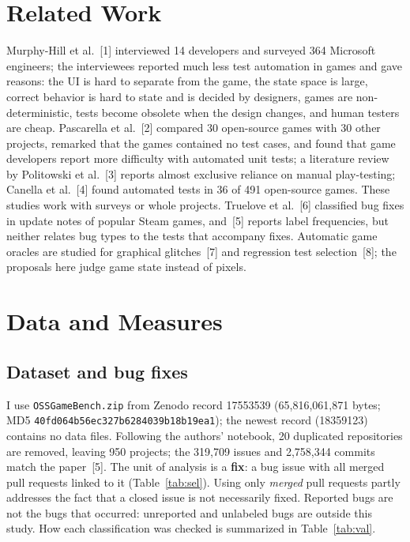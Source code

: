\documentclass[10pt,twocolumn,a4paper]{article}
\begin{document}
\section{Related Work}

Murphy-Hill et al.~[1] interviewed 14 developers and surveyed 364 Microsoft engineers; the interviewees reported much less test automation in games and gave reasons: the UI is hard to separate from the game, the state space is large, correct behavior is hard to state and is decided by designers, games are non-deterministic, tests become obsolete when the design changes, and human testers are cheap.
Pascarella et al.~[2] compared 30 open-source games with 30 other projects, remarked that the games contained no test cases, and found that game developers report more difficulty with automated unit tests; a literature review by Politowski et al.~[3] reports almost exclusive reliance on manual play-testing; Canella et al.~[4] found automated tests in 36 of 491 open-source games.
These studies work with surveys or whole projects.
Truelove et al.~[6] classified bug fixes in update notes of popular Steam games, and~[5] reports label frequencies, but neither relates bug types to the tests that accompany fixes.
Automatic game oracles are studied for graphical glitches~[7] and regression test selection~[8]; the proposals here judge game state instead of pixels.

\section{Data and Measures}\label{sec:data}

\subsection{Dataset and bug fixes}\label{sec:selection}
I use \texttt{OSSGameBench.zip} from Zenodo record 17553539 (65,816,061,871 bytes; MD5 \texttt{40fd064b56ec327b6284039b18b19ea1}); the newest record (18359123) contains no data files.
Following the authors' notebook, 20 duplicated repositories are removed, leaving 950 projects; the 319,709 issues and 2,758,344 commits match the paper~[5].
The unit of analysis is a \textbf{fix}: a bug issue with all merged pull requests linked to it (Table~\ref{tab:sel}).
Using only \emph{merged} pull requests partly addresses the fact that a closed issue is not necessarily fixed.
Reported bugs are not the bugs that occurred: unreported and unlabeled bugs are outside this study.
How each classification was checked is summarized in Table~\ref{tab:val}.
\end{document}
